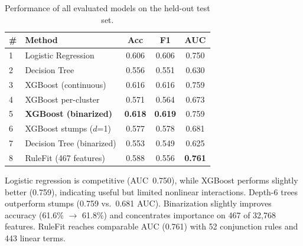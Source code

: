 \documentclass[sigconf,natbib=false, language=english]{acmart}
\begin{document}
\begin{table}[ht]
\centering
\caption{Performance of all evaluated models on the held-out test set.}
\label{tab:results}
\begin{tabular}{@{}llccc@{}}
\toprule
\# & Method & Acc & F1 & AUC \\
\midrule
1 & Logistic Regression      & 0.606 & 0.606 & 0.750 \\
2 & Decision Tree            & 0.556 & 0.551 & 0.630 \\
3 & XGBoost (continuous)     & 0.616 & 0.616 & 0.759 \\
4 & XGBoost per-cluster      & 0.571 & 0.564 & 0.673 \\
5 & \textbf{XGBoost (binarized)}      & \textbf{0.618} & \textbf{0.619} & 0.759 \\
6 & XGBoost stumps ($d$=1)   & 0.577 & 0.578 & 0.681 \\
7 & Decision Tree (binarized) & 0.553 & 0.549 & 0.625 \\
8 & RuleFit (467 features)   & 0.588 & 0.556 & \textbf{0.761} \\
\bottomrule
\end{tabular}
\end{table}

Logistic regression is competitive (AUC~0.750), while XGBoost performs slightly better (0.759), indicating useful but limited nonlinear interactions. Depth-6 trees outperform stumps (0.759 vs.\ 0.681 AUC). Binarization slightly improves accuracy (61.6\% $\rightarrow$ 61.8\%) and concentrates importance on 467 of 32,768 features. RuleFit reaches comparable AUC (0.761) with 52 conjunction rules and 443 linear terms.
\end{document}
